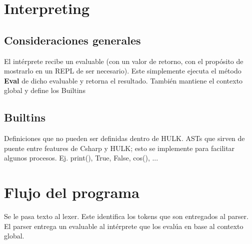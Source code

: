 \documentclass{report}
\begin{document}
\chapter{Interpreting}

\section{Consideraciones generales}
El intérprete recibe un evaluable (con un valor de retorno, con el propósito de mostrarlo en un REPL de ser necesario). Este simplemente ejecuta el método \textbf{Eval} de dicho evaluable y retorna el resultado.
También mantiene el contexto global y define los Builtins

\section{Builtins}
Definiciones que no pueden ser definidas dentro de HULK. ASTs que sirven de puente entre features de Csharp y HULK; esto se implemente para facilitar algunos procesos.
Ej. print(), True, False, cos(), ...

\chapter{Flujo del programa}

Se le pasa texto al lexer. Este identifica los tokens que son entregados al parser. El parser entrega un evaluable al intérprete que los evalúa en base al contexto global.
\end{document}
